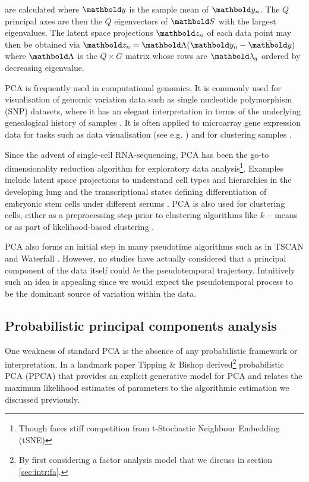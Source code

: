 are calculated where $\bar{\mby}$ is the sample mean of $\mby_n$. The $Q$ principal axes are then the $Q$ eigenvectors of $\mbS$ with the largest eigenvalues. The latent space projections $\mbz_n$ of each data point may then be obtained via $\mbz_n = \mbLambda (\mby_n - \bar{\mby})$ where $\mbLambda$ is the $Q \times G$ matrix whose rows are $\mblambda_q$ ordered by decreasing eigenvalue.

PCA is frequently used in computational genomics. It is commonly used for visualisation of genomic variation data such as single nucleotide polymorphism (SNP) datasets, where it has an elegant interpretation in terms of the underlying genealogical history of samples \cite{mcvean2009genealogical}.
It is often applied to microarray gene expression data for tasks such as data visualisation (see e.g. \cite{ringner2008principal}) and for clustering samples \cite{yeung2001principal}.

Since the advent of single-cell RNA-sequencing, PCA has been the go-to dimensionality reduction algorithm for exploratory data analysis\footnote{Though faces stiff competition from t-Stochastic Neighbour Embedding (tSNE)}. Examples include latent space projections to understand cell types and hierarchies in the developing lung \cite{treutlein2014reconstructing} and the transcriptional states defining differentiation of embryonic stem cells under different serums \cite{kolodziejczyk2015single}. PCA is also used for clustering cells, either as a preprocessing step prior to clustering algorithms like $k-$means or as part of likelihood-based clustering \cite{yau2016pcareduce}.

PCA also forms an initial step in many pseudotime algorithms such as in TSCAN \cite{ji2016tscan} and Waterfall \cite{shin2015single}. However, no studies have actually considered that a principal component of the data itself could \emph{be} the pseudotemporal trajectory. Intuitively such an idea is appealing since we would expect the pseudotemporal process to be the dominant source of variation within the data.

\subsection{Probabilistic principal components analysis}

One weakness of standard PCA is the absence of any probabilistic framework or interpretation. In a landmark paper \cite{tipping1999probabilistic} Tipping \& Bishop derived\footnote{By first considering a factor analysis model that we discuss in section \ref{sec:intr:fa}.} probabilistic PCA (PPCA) that provides an explicit generative model for PCA and relates the maximum likelihood estimates of parameters to the algorithmic estimation we discussed previously.

